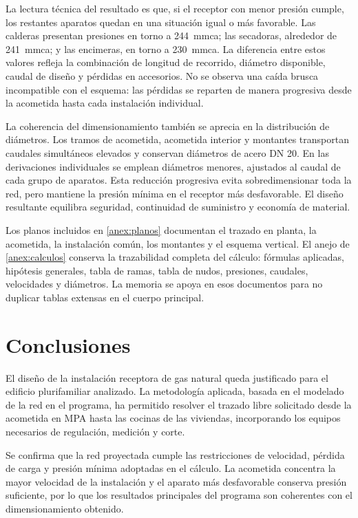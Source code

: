 \documentclass[12pt,a4paper]{article}
\begin{document}
La lectura técnica del resultado es que, si el receptor con menor presión cumple, los restantes aparatos quedan en una situación igual o más favorable. Las calderas presentan presiones en torno a \SI{244}{mmca}; las secadoras, alrededor de \SI{241}{mmca}; y las encimeras, en torno a \SI{230}{mmca}. La diferencia entre estos valores refleja la combinación de longitud de recorrido, diámetro disponible, caudal de diseño y pérdidas en accesorios. No se observa una caída brusca incompatible con el esquema: las pérdidas se reparten de manera progresiva desde la acometida hasta cada instalación individual.

La coherencia del dimensionamiento también se aprecia en la distribución de diámetros. Los tramos de acometida, acometida interior y montantes transportan caudales simultáneos elevados y conservan diámetros de acero DN 20. En las derivaciones individuales se emplean diámetros menores, ajustados al caudal de cada grupo de aparatos. Esta reducción progresiva evita sobredimensionar toda la red, pero mantiene la presión mínima en el receptor más desfavorable. El diseño resultante equilibra seguridad, continuidad de suministro y economía de material.

Los planos incluidos en \cref{anex:planos} documentan el trazado en planta, la acometida, la instalación común, los montantes y el esquema vertical. El anejo de \cref{anex:calculos} conserva la trazabilidad completa del cálculo: fórmulas aplicadas, hipótesis generales, tabla de ramas, tabla de nudos, presiones, caudales, velocidades y diámetros. La memoria se apoya en esos documentos para no duplicar tablas extensas en el cuerpo principal.

\section{Conclusiones}

El diseño de la instalación receptora de gas natural queda justificado para el edificio plurifamiliar analizado. La metodología aplicada, basada en el modelado de la red en el programa, ha permitido resolver el trazado libre solicitado desde la acometida en MPA hasta las cocinas de las viviendas, incorporando los equipos necesarios de regulación, medición y corte.

Se confirma que la red proyectada cumple las restricciones de velocidad, pérdida de carga y presión mínima adoptadas en el cálculo. La acometida concentra la mayor velocidad de la instalación y el aparato más desfavorable conserva presión suficiente, por lo que los resultados principales del programa son coherentes con el dimensionamiento obtenido.
\end{document}

